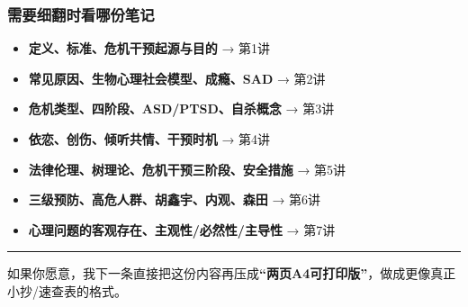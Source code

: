 \documentclass[
  a4paper,
]{ctexart}
\providecommand{\tightlist}{%
  \setlength{\itemsep}{0pt}\setlength{\parskip}{0pt}}
\begin{document}
\subsubsection{需要细翻时看哪份笔记}\label{ux9700ux8981ux7ec6ux7ffbux65f6ux770bux54eaux4efdux7b14ux8bb0}

\begin{itemize}
\tightlist
\item
  \textbf{定义、标准、危机干预起源与目的} → 第1讲
\item
  \textbf{常见原因、生物心理社会模型、成瘾、SAD} → 第2讲
\item
  \textbf{危机类型、四阶段、ASD/PTSD、自杀概念} → 第3讲\\
\item
  \textbf{依恋、创伤、倾听共情、干预时机} → 第4讲\\
\item
  \textbf{法律伦理、树理论、危机干预三阶段、安全措施} → 第5讲\\
\item
  \textbf{三级预防、高危人群、胡鑫宇、内观、森田} → 第6讲\\
\item
  \textbf{心理问题的客观存在、主观性/必然性/主导性} → 第7讲
\end{itemize}

\begin{center}\rule{0.5\linewidth}{0.5pt}\end{center}

如果你愿意，我下一条直接把这份内容再压成\textbf{``两页A4可打印版''}，做成更像真正小抄/速查表的格式。
\end{document}
